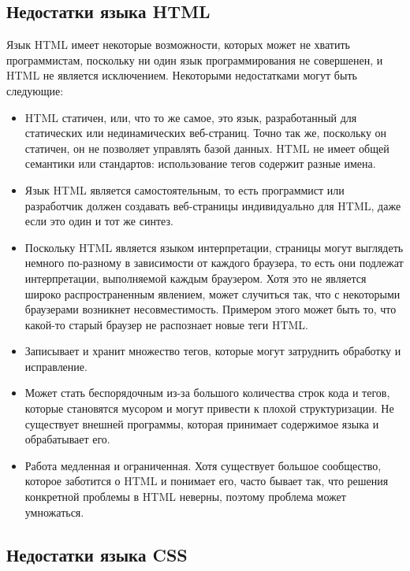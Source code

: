 \subsection{Недостатки языка HTML}

Язык HTML имеет некоторые возможности, которых может не хватить программистам, поскольку ни один язык программирования не совершенен, и HTML не является исключением. Некоторыми недостатками могут быть следующие:

\begin{itemize}
\item HTML статичен, или, что то же самое, это язык, разработанный для статических или нединамических веб-страниц. Точно так же, поскольку он статичен, он не позволяет управлять базой данных.
HTML не имеет общей семантики или стандартов: использование тегов содержит разные имена.

\item Язык HTML является самостоятельным, то есть программист или разработчик должен создавать веб-страницы индивидуально для HTML, даже если это один и тот же синтез.

\item Поскольку HTML является языком интерпретации, страницы могут выглядеть немного по-разному в зависимости от каждого браузера, то есть они подлежат интерпретации, выполняемой каждым браузером.
Хотя это не является широко распространенным явлением, может случиться так, что с некоторыми браузерами возникнет несовместимость. Примером этого может быть то, что какой-то старый браузер не распознает новые теги HTML.
\item Записывает и хранит множество тегов, которые могут затруднить обработку и исправление.

\item Может стать беспорядочным из-за большого количества строк кода и тегов, которые становятся мусором и могут привести к плохой структуризации.
Не существует внешней программы, которая принимает содержимое языка и обрабатывает его.

\item Работа медленная и ограниченная.
Хотя существует большое сообщество, которое заботится о HTML и понимает его, часто бывает так, что решения конкретной проблемы в HTML неверны, поэтому проблема может умножаться.
\end{itemize}

\subsection{ Недостатки языка CSS}

